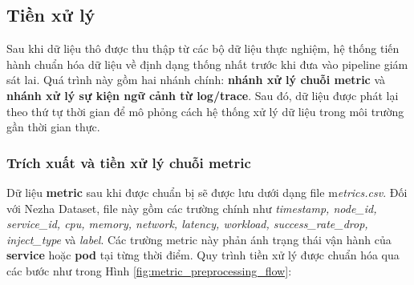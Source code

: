 \subsection{Tiền xử lý}
Sau khi dữ liệu thô được thu thập từ các bộ dữ liệu thực nghiệm, hệ thống tiến hành chuẩn hóa dữ liệu về định dạng thống nhất trước khi đưa vào pipeline giám sát lai. Quá trình này gồm hai nhánh chính: \textbf{nhánh xử lý chuỗi metric} và \textbf{nhánh xử lý sự kiện ngữ cảnh từ log/trace}. Sau đó, dữ liệu được phát lại theo thứ tự thời gian để mô phỏng cách hệ thống xử lý dữ liệu trong môi trường gần thời gian thực.
\subsubsection{Trích xuất và tiền xử lý chuỗi metric}
Dữ liệu \textbf{metric} sau khi được chuẩn bị sẽ được lưu dưới dạng file m\textit{etrics.csv}. Đối với Nezha Dataset, file này gồm các trường chính như \textit{timestamp, node\_id, service\_id, cpu, memory, network, latency, workload, success\_rate\_drop, inject\_type} và \textit{label}. Các trường metric này phản ánh trạng thái vận hành của \textbf{service} hoặc \textbf{pod} tại từng thời điểm.
Quy trình tiền xử lý được chuẩn hóa qua các bước như trong Hình \ref{fig:metric_preprocessing_flow}:
